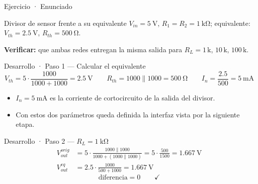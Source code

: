 \documentclass[aspectratio=169]{beamer}
\begin{document}
\begin{frame}{Ejercicio · Enunciado}
  \begin{block}{Divisor de sensor frente a su equivalente}
    \centering
    $V_{in} = \SI{5}{\volt}$, $R_1 = R_2 = \SI{1}{\kilo\ohm}$; \quad equivalente: $V_{th} = \SI{2.5}{\volt}$, $R_{th} = \SI{500}{\ohm}$.
  \end{block}
  \begin{center}
  \end{center}
  \textbf{Verificar:} que ambas redes entregan la misma salida para $R_L = 1\,\text{k}$, $10\,\text{k}$, $100\,\text{k}$.
\end{frame}

\begin{frame}{Desarrollo · Paso 1 — Calcular el equivalente}
  \[
    V_{th} = 5\cdot\frac{1000}{1000+1000} = \SI{2.5}{\volt}
    \qquad
    R_{th} = 1000\parallel 1000 = \SI{500}{\ohm}
    \qquad
    I_n = \frac{2.5}{500} = \SI{5}{\milli\ampere}
  \]
  \pause
  \begin{itemize}
    \item $I_n = \SI{5}{\milli\ampere}$ es la corriente de cortocircuito de la salida del divisor.
    \item Con estos dos parámetros queda definida la interfaz vista por la siguiente etapa.
  \end{itemize}
\end{frame}

\begin{frame}{Desarrollo · Paso 2 — $R_L = \SI{1}{\kilo\ohm}$}
  \begin{align*}
    V_{out}^{orig} &= 5\cdot\frac{1000\parallel 1000}{1000 + (1000\parallel 1000)}
                     = 5\cdot\frac{500}{1500} = \SI{1.667}{\volt}\\[2pt]
    V_{out}^{eq} &= 2.5\cdot\frac{1000}{500+1000} = \SI{1.667}{\volt}
  \end{align*}
  \[
    \text{diferencia} = 0 \qquad\checkmark
  \]
\end{frame}
\end{document}
